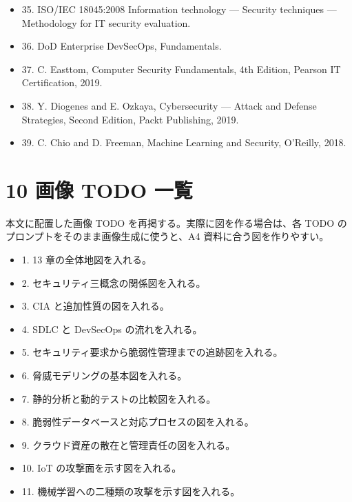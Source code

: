 \documentclass[uplatex,dvipdfmx,a4paper,11pt]{jsarticle}
\begin{document}
\begin{itemize}[leftmargin=2em]
\item 35. ISO/IEC 18045:2008 Information technology — Security techniques — Methodology for IT security evaluation.
\item 36. DoD Enterprise DevSecOps, Fundamentals.
\item 37. C. Easttom, Computer Security Fundamentals, 4th Edition, Pearson IT Certification, 2019.
\item 38. Y. Diogenes and E. Ozkaya, Cybersecurity — Attack and Defense Strategies, Second Edition, Packt Publishing, 2019.
\item 39. C. Chio and D. Freeman, Machine Learning and Security, O’Reilly, 2018.
\end{itemize}
\section{10 画像 TODO 一覧}
本文に配置した画像 TODO を再掲する。実際に図を作る場合は、各 TODO のプロンプトをそのまま画像生成に使うと、A4 資料に合う図を作りやすい。

\begin{itemize}[leftmargin=2em]
\item 1. 13 章の全体地図を入れる。
\item 2. セキュリティ三概念の関係図を入れる。
\item 3. CIA と追加性質の図を入れる。
\item 4. SDLC と DevSecOps の流れを入れる。
\item 5. セキュリティ要求から脆弱性管理までの追跡図を入れる。
\item 6. 脅威モデリングの基本図を入れる。
\item 7. 静的分析と動的テストの比較図を入れる。
\item 8. 脆弱性データベースと対応プロセスの図を入れる。
\item 9. クラウド資産の散在と管理責任の図を入れる。
\item 10. IoT の攻撃面を示す図を入れる。
\item 11. 機械学習への二種類の攻撃を示す図を入れる。
\end{itemize}
\end{document}
